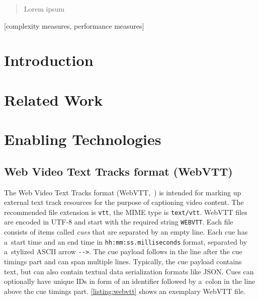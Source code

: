 \documentclass{sig-alternate}
\begin{document}
\date{30 July 1999}

\maketitle
\begin{abstract}
Lorem ipsum
\end{abstract}

[complexity measures, performance measures]



\section{Introduction}

\section{Related Work}

\cite{vandeursen2012mediafragmentannotations}

\section{Enabling Technologies}

\subsection{Web Video Text Tracks format (WebVTT)}

The Web Video Text Tracks format (WebVTT,~\cite{pfeiffer2013webvtt})
is intended for marking up external text track resources
for the purpose of captioning video content.
The recommended file extension is \texttt{vtt},
the MIME type is \texttt{text/vtt}.
WebVTT files are encoded in UTF-8 and
start with the required string \texttt{WEBVTT}.
Each file consists of items called \emph{cues}
that are separated by an empty line.
Each cue has a~start time and an end time in
\texttt{hh:mm:ss.milliseconds} format,
separated by a~stylized ASCII arrow \texttt{-}\texttt{->}.
The cue payload follows in the line after the cue timings part
and can span multiple lines.
Typically, the cue payload contains text,
but can also contain textual data serialization formats like JSON.
Cues can optionally have unique IDs
in form of an identifier followed by a~colon in the line
above the cue timings part.
\autoref{listing:webvtt} shows an exemplary WebVTT file.
\end{document}
